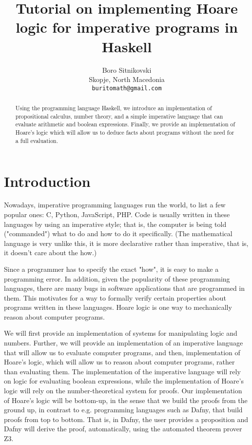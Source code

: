 \documentclass{article}
\title{Tutorial on implementing Hoare logic for imperative programs in Haskell}
\author{
  Boro Sitnikovski \\
  Skopje, North Macedonia \\
  \texttt{buritomath@gmail.com} \\
}
\begin{document}
\maketitle

\begin{abstract}
Using the programming language Haskell, we introduce an implementation of propositional calculus, number theory, and a simple imperative language that can evaluate arithmetic and boolean expressions. Finally, we provide an implementation of Hoare's logic which will allow us to deduce facts about programs without the need for a full evaluation.
\end{abstract}


\section{Introduction}

Nowadays, imperative programming languages run the world, to list a few popular ones: C, Python, JavaScript, PHP. Code is usually written in these languages by using an imperative style; that is, the computer is being told ("commanded") what to do and how to do it specifically. (The mathematical language is very unlike this, it is more declarative rather than imperative, that is, it doesn't care about the how.)

Since a programmer has to specify the exact "how", it is easy to make a programming error. In addition, given the popularity of these programming languages, there are many bugs in software applications that are programmed in them. This motivates for a way to formally verify certain properties about programs written in these languages. Hoare logic is one way to mechanically reason about computer programs.

We will first provide an implementation of systems for manipulating logic and numbers. Further, we will provide an implementation of an imperative language that will allow us to evaluate computer programs, and then, implementation of Hoare's logic, which will allow us to reason about computer programs, rather than evaluating them. The implementation of the imperative language will rely on logic for evaluating boolean expressions, while the implementation of Hoare's logic will rely on the number-theoretical system for proofs. Our implementation of Hoare's logic will be bottom-up, in the sense that we build the proofs from the ground up, in contrast to e.g. programming languages such as Dafny\cite{b1}, that build proofs from top to bottom. That is, in Dafny, the user provides a proposition and Dafny will derive the proof, automatically, using the automated theorem prover Z3\cite{b2}.
\end{document}
